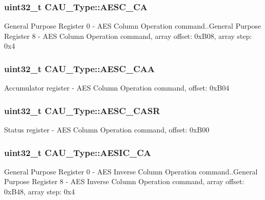 \subsubsection[{\texorpdfstring{A\+E\+S\+C\+\_\+\+CA}{AESC_CA}}]{ uint32\+\_\+t C\+A\+U\+\_\+\+Type\+::\+A\+E\+S\+C\+\_\+\+CA}\hypertarget{structCAU__Type_aa494a73b9f068b56c4e605a44840d817}{}\label{structCAU__Type_aa494a73b9f068b56c4e605a44840d817}
General Purpose Register 0 -\/ A\+ES Column Operation command..General Purpose Register 8 -\/ A\+ES Column Operation command, array offset\+: 0x\+B08, array step\+: 0x4 
\subsubsection[{\texorpdfstring{A\+E\+S\+C\+\_\+\+C\+AA}{AESC_CAA}}]{ uint32\+\_\+t C\+A\+U\+\_\+\+Type\+::\+A\+E\+S\+C\+\_\+\+C\+AA}\hypertarget{structCAU__Type_afe2517a5ce47c934e22ff5f0e2fbf6a8}{}\label{structCAU__Type_afe2517a5ce47c934e22ff5f0e2fbf6a8}
Accumulator register -\/ A\+ES Column Operation command, offset\+: 0x\+B04 
\subsubsection[{\texorpdfstring{A\+E\+S\+C\+\_\+\+C\+A\+SR}{AESC_CASR}}]{ uint32\+\_\+t C\+A\+U\+\_\+\+Type\+::\+A\+E\+S\+C\+\_\+\+C\+A\+SR}\hypertarget{structCAU__Type_a8c6be876475ac547c6abcea715cb2bc6}{}\label{structCAU__Type_a8c6be876475ac547c6abcea715cb2bc6}
Status register -\/ A\+ES Column Operation command, offset\+: 0x\+B00 
\subsubsection[{\texorpdfstring{A\+E\+S\+I\+C\+\_\+\+CA}{AESIC_CA}}]{ uint32\+\_\+t C\+A\+U\+\_\+\+Type\+::\+A\+E\+S\+I\+C\+\_\+\+CA}\hypertarget{structCAU__Type_ad71c2e5f05ef835c2883db3205337d46}{}\label{structCAU__Type_ad71c2e5f05ef835c2883db3205337d46}
General Purpose Register 0 -\/ A\+ES Inverse Column Operation command..General Purpose Register 8 -\/ A\+ES Inverse Column Operation command, array offset\+: 0x\+B48, array step\+: 0x4 
